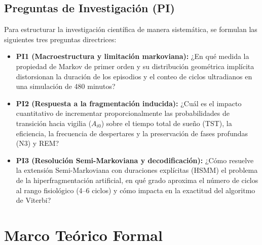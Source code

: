 \documentclass[11pt,a4paper]{article}
\begin{document}
\subsection{Preguntas de Investigación (PI)}
Para estructurar la investigación científica de manera sistemática, se formulan las siguientes tres preguntas directrices:
\begin{itemize}[leftmargin=*,itemsep=1pt]
    \item \textbf{PI1 (Macroestructura y limitación markoviana):} ¿En qué medida la propiedad de Markov de primer orden y su distribución geométrica implícita distorsionan la duración de los episodios y el conteo de ciclos ultradianos en una simulación de 480 minutos?
    \item \textbf{PI2 (Respuesta a la fragmentación inducida):} ¿Cuál es el impacto cuantitativo de incrementar proporcionalmente las probabilidades de transición hacia vigilia ($A_{i0}$) sobre el tiempo total de sueño (TST), la eficiencia, la frecuencia de despertares y la preservación de fases profundas (N3) y REM?
    \item \textbf{PI3 (Resolución Semi-Markoviana y decodificación):} ¿Cómo resuelve la extensión Semi-Markoviana con duraciones explícitas (HSMM) el problema de la hiperfragmentación artificial, en qué grado aproxima el número de ciclos al rango fisiológico (4--6 ciclos) y cómo impacta en la exactitud del algoritmo de Viterbi?
\end{itemize}

\section{Marco Teórico Formal}
\end{document}
